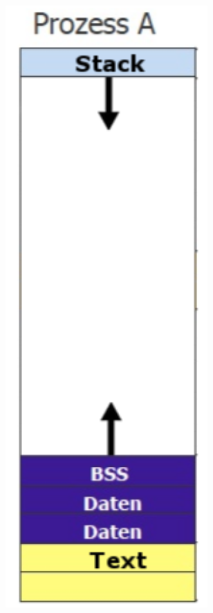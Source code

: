 \documentclass[ddcfooter,nosectionnum]{tudbeamer}
\begin{document}
\begin{frame}
\begin{minipage}[b] {0.29\textwidth}
\includegraphics[width=0.58\textwidth]{segmente.png}
\end{minipage} 
\end{frame}
\end{document}
